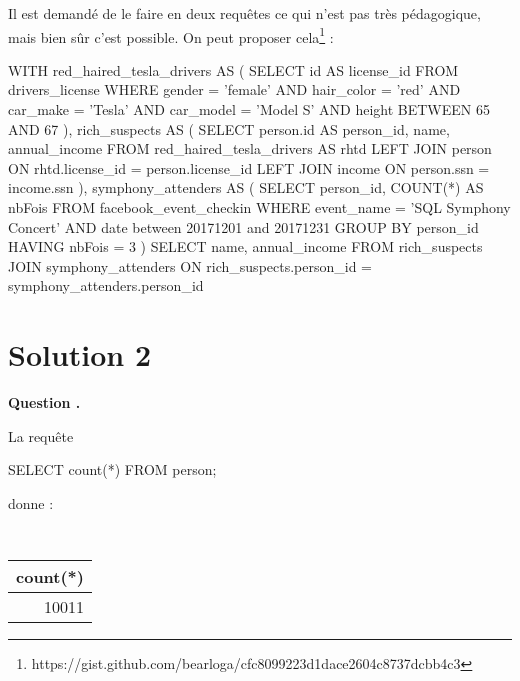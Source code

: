 \documentclass[10pt]{article}
\newcounter{cexo}
\newenvironment{qexo}{
\refstepcounter{cexo}
\vspace{3 pt}
\noindent
\begin{minipage}[t]{0.15\textwidth}
\textbf{\noindent Question \arabic{cexo}. }
\end{minipage}\noindent
\begin{minipage}[t]{0.85\textwidth}}{\vspace{3 pt}
\end{minipage}}%
\begin{document}
Il est demandé de le faire en deux requêtes ce qui n'est pas très pédagogique, mais bien sûr c'est possible. On peut proposer cela\footnote{https://gist.github.com/bearloga/cfc8099223d1dace2604c8737dcbb4c3} :
\begin{sql}
WITH red_haired_tesla_drivers AS (
    SELECT id AS license_id
    FROM drivers_license
    WHERE gender = 'female' AND hair_color = 'red'
    AND car_make = 'Tesla' AND car_model = 'Model S'
    AND height BETWEEN 65 AND 67 
), rich_suspects AS (
    SELECT person.id AS person_id, name, annual_income
    FROM red_haired_tesla_drivers AS rhtd
    LEFT JOIN person ON rhtd.license_id = person.license_id
    LEFT JOIN income ON person.ssn = income.ssn
), symphony_attenders AS (
    SELECT person_id, COUNT(*) AS nbFois
    FROM facebook_event_checkin
    WHERE event_name = 'SQL Symphony Concert'
	AND date between 20171201 and 20171231 
    GROUP BY person_id
    HAVING nbFois = 3 
)
SELECT name, annual_income
FROM rich_suspects
JOIN symphony_attenders ON rich_suspects.person_id = symphony_attenders.person_id
\end{sql}




\section{Solution 2}

\begin{qexo}
\end{qexo}
La requête
\begin{sql}
SELECT count(*) FROM person;
\end{sql}
donne :
\begin{table}[!htp]
\centering
{\tt
\begin{tabular}{r}
count(*) \\ \hline
10011
\end{tabular}
}
\end{table}
\end{document}

